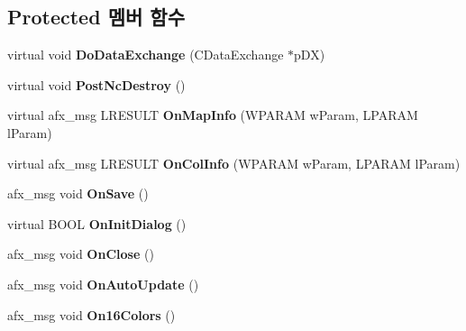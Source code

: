 \subsection*{Protected 멤버 함수}
\begin{DoxyCompactItemize}
\item 
\mbox{\label{class_tile_view_a6c10f973f1ebbb7169bd6440572a9328}} 
virtual void {\bfseries Do\+Data\+Exchange} (C\+Data\+Exchange $\ast$p\+DX)
\item 
\mbox{\label{class_tile_view_a83fee9256658f418f7562c0ff098eb22}} 
virtual void {\bfseries Post\+Nc\+Destroy} ()
\item 
\mbox{\label{class_tile_view_ae4ba4c47c672fb6e856fbe3921e3667e}} 
virtual afx\+\_\+msg L\+R\+E\+S\+U\+LT {\bfseries On\+Map\+Info} (W\+P\+A\+R\+AM w\+Param, L\+P\+A\+R\+AM l\+Param)
\item 
\mbox{\label{class_tile_view_ad01d09783bbe107d9837d6847938e564}} 
virtual afx\+\_\+msg L\+R\+E\+S\+U\+LT {\bfseries On\+Col\+Info} (W\+P\+A\+R\+AM w\+Param, L\+P\+A\+R\+AM l\+Param)
\item 
\mbox{\label{class_tile_view_ae318b9ed3c7567dcbc897c77d063a0eb}} 
afx\+\_\+msg void {\bfseries On\+Save} ()
\item 
\mbox{\label{class_tile_view_a597e32fa09187fe6ea909cca947bfbc1}} 
virtual B\+O\+OL {\bfseries On\+Init\+Dialog} ()
\item 
\mbox{\label{class_tile_view_a88e865b649c2a32c403670cca70ed55c}} 
afx\+\_\+msg void {\bfseries On\+Close} ()
\item 
\mbox{\label{class_tile_view_ab51dcedc72c43cf57133d4adcd264c10}} 
afx\+\_\+msg void {\bfseries On\+Auto\+Update} ()
\item 
\mbox{\label{class_tile_view_a482139c5bc655015ba0700db5c04ec91}} 
afx\+\_\+msg void {\bfseries On16\+Colors} ()
\item 
\mbox{\label{class_tile_view_a021f1139dccc2ec023a315ed1f4619e1}} 

\end{DoxyCompactItemize}
